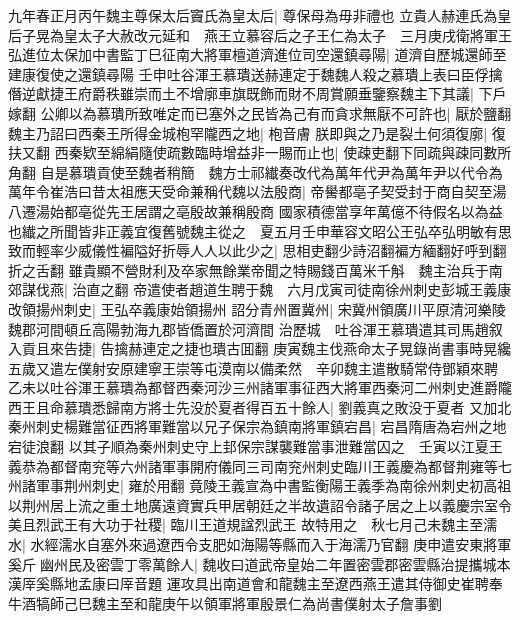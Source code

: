 九年春正月丙午魏主尊保太后竇氏為皇太后|{
	尊保母為毋非禮也}
立貴人赫連氏為皇后子晃為皇太子大赦改元延和　燕王立慕容后之子王仁為太子　三月庚戌衛將軍王弘進位太保加中書監丁巳征南大將軍檀道濟進位司空還鎮尋陽|{
	道濟自歷城還師至建康復使之還鎮尋陽}
壬申吐谷渾王慕璝送赫連定于魏魏人殺之慕璝上表曰臣俘擒僭逆獻捷王府爵秩雖崇而土不增廓車旗既飾而財不周賞願垂鑒察魏主下其議|{
	下戶嫁翻}
公卿以為慕璝所致唯定而已塞外之民皆為己有而貪求無厭不可許也|{
	厭於鹽翻}
魏主乃詔曰西秦王所得金城枹罕隴西之地|{
	枹音膚}
朕即與之乃是裂土何須復廓|{
	復扶又翻}
西秦欵至綿絹隨使疏數臨時增益非一賜而止也|{
	使疎吏翻下同疏與疎同數所角翻}
自是慕璝貢使至魏者稍簡　魏方士祁纎奏改代為萬年代尹為萬年尹以代令為萬年令崔浩曰昔太祖應天受命兼稱代魏以法殷商|{
	帝嚳都亳子契受封于商自契至湯八遷湯始都亳從先王居謂之亳殷故兼稱殷商}
國家積德當享年萬億不待假名以為益也纎之所聞皆非正義宜復舊號魏主從之　夏五月壬申華容文昭公王弘卒弘明敏有思致而輕率少威儀性褊隘好折辱人人以此少之|{
	思相吏翻少詩沼翻褊方緬翻好呼到翻折之舌翻}
雖貴顯不營財利及卒家無餘業帝聞之特賜錢百萬米千斛　魏主治兵于南郊謀伐燕|{
	治直之翻}
帝遣使者趙道生聘于魏　六月戊寅司徒南徐州刺史彭城王義康改領揚州刺史|{
	王弘卒義康始領揚州}
詔分青州置冀州|{
	宋冀州領廣川平原清河樂陵魏郡河間頓丘高陽勃海九郡皆僑置於河濟間}
治歷城　吐谷渾王慕璝遣其司馬趙叙入貢且來告捷|{
	告擒赫連定之捷也璝古囬翻}
庚寅魏主伐燕命太子晃錄尚書事時晃纔五歲又遣左僕射安原建寧王崇等屯漠南以備柔然　辛卯魏主遣散騎常侍鄧穎來聘　乙未以吐谷渾王慕璝為都督西秦河沙三州諸軍事征西大將軍西秦河二州刺史進爵隴西王且命慕璝悉歸南方將士先没於夏者得百五十餘人|{
	劉義真之敗没于夏者}
又加北秦州刺史楊難當征西將軍難當以兄子保宗為鎮南將軍鎮宕昌|{
	宕昌隋唐為宕州之地宕徒浪翻}
以其子順為秦州刺史守上邽保宗謀襲難當事泄難當囚之　壬寅以江夏王義恭為都督南兖等六州諸軍事開府儀同三司南兖州刺史臨川王義慶為都督荆雍等七州諸軍事荆州刺史|{
	雍於用翻}
竟陵王義宣為中書監衡陽王義季為南徐州刺史初高祖以荆州居上流之重土地廣遠資實兵甲居朝廷之半故遺詔令諸子居之上以義慶宗室令美且烈武王有大功于社稷|{
	臨川王道規諡烈武王}
故特用之　秋七月己未魏主至濡水|{
	水經濡水自塞外來過遼西令支肥如海陽等縣而入于海濡乃官翻}
庚申遣安東將軍奚斤幽州民及密雲丁零萬餘人|{
	魏收曰道武帝皇始二年置密雲郡密雲縣治提攜城本漢厗奚縣地孟康曰厗音題}
運攻具出南道會和龍魏主至遼西燕王遣其侍御史崔聘奉牛酒犒師己巳魏主至和龍庚午以領軍將軍殷景仁為尚書僕射太子詹事劉

